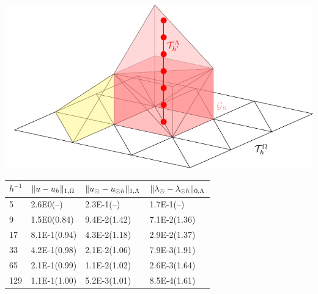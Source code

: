 
\begin{table}
\begin{minipage}[b]{0.35\linewidth}
 \centering
 \includegraphics[width=\textwidth]{graphics/nonconform_mesh.pdf}
 \vspace{-20pt}
\label{fig:unfit}
\end{minipage}
\hspace{2pt}
    \begin{minipage}[b]{0.62\linewidth}
  \scriptsize{
  \begin{center}
    \begin{tabular}{l|lll}
      \toprule
    $h^{-1}$ & $\lVert{u-u_h}\rVert_{1, \Omega}$ & $\lVert{u_{\odot}-u_{\odot h}}\rVert_{1, \Lambda}$ & $\lVert{\lambda_{\odot}-\lambda_{\odot h}}\rVert_{0,\Lambda}$\\
      \hline
5   & 2.6E0(--)    & 2.3E-1(--)   & 1.7E-1(--) \\ 
9   & 1.5E0(0.84)  & 9.4E-2(1.42) & 7.1E-2(1.36)\\
17  & 8.1E-1(0.94) & 4.3E-2(1.18) & 2.9E-2(1.37)\\
33  & 4.2E-1(0.98) & 2.1E-2(1.06) & 7.9E-3(1.91)\\
65  & 2.1E-1(0.99) & 1.1E-2(1.02) & 2.6E-3(1.64)\\
129 & 1.1E-1(1.00) & 5.2E-3(1.01) & 8.5E-4(1.61)\\
\bottomrule
    \end{tabular}
  \end{center}    
}    
  \label{tab:error_unfit}    
  \end{minipage}
\end{table}

